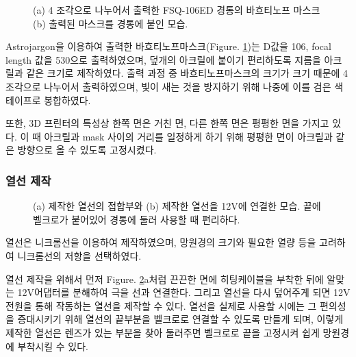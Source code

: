 \begin{figure}[ht]
	\begin{center}
	\end{center}
	\caption{(a) 4 조각으로 나누어서 출력한 FSQ-106ED 경통의 바흐티노프 마스크 (b) 출력된 마스크를 경통에 붙인 모습.}
	\label{mask}
\end{figure}

Astrojargon을 이용하여 출력한 바흐티노프마스크(\textrm{Figure}. \ref{mask})는 D값을 106, focal length 값을 530으로 출력하였으며, 덮개의 아크릴에 붙이기 편리하도록 지름을 아크릴과 같은 크기로 제작하였다. 출력 과정 중 바흐티노프마스크의 크기가 크기 때문에 4조각으로 나누어서 출력하였으며, 빛이 새는 것을 방지하기 위해 나중에 이를 검은 색 테이프로 봉합하였다. 

또한, 3D 프린터의 특성상 한쪽 면은 거친 면, 다른 한쪽 면은 평평한 면을 가지고 있다. 이 때 아크릴과 mask 사이의 거리를 일정하게 하기 위해 평평한 면이 아크릴과 같은 방향으로 올 수 있도록 고정시켰다.

\subsubsection{열선 제작}
\begin{figure}[h]
	\begin{center}
	\end{center}
	\caption{(a) 제작한 열선의 접합부와 (b) 제작한 열선을 12V에 연결한 모습. 끝에 벨크로가 붙어있어 경통에 둘러 사용할 때 편리하다.}
	\label{thermic}
\end{figure}

열선은  니크롬선을 이용하여 제작하였으며, 망원경의 크기와 필요한 열량 등을 고려하여 니크롬선의 저항을 선택하였다.

열선 제작을 위해서 먼저 \textrm{Figure}. \ref{thermic}a처럼 끈끈한 면에 히팅케이블을 부착한 뒤에 알맞는 12V어댑터를 분해하여 극을 선과 연결한다. 그리고 열선을 다시 덮어주게 되면 12V 전원을 통해 작동하는 열선을 제작할 수 있다. 열선을 실제로 사용할 시에는 그 편의성을 증대시키기 위해 열선의 끝부분을 벨크로로 연결할 수 있도록 만들게 되며, 이렇게 제작한 열선은 렌즈가 있는 부분을 찾아 둘러주면 벨크로로 끝을 고정시켜 쉽게 망원경에 부착시킬 수 있다.

